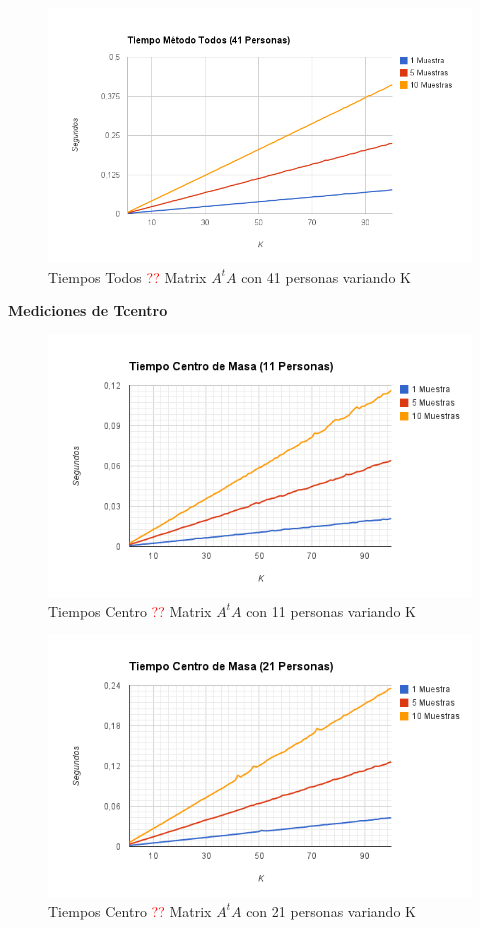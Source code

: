 \begin{figure}[H]
\includegraphics[width=1\textwidth]{img/image6.png}
     \caption{Tiempos Todos \textcolor{red}{??} Matrix $A^tA$ con 41 personas variando K}
     \label{fig:figura1}
\end{figure}


\textbf{Mediciones de Tcentro }

\begin{figure}[H]
\includegraphics[width=1\textwidth]{img/image7.png}
     \caption{Tiempos Centro \textcolor{red}{??} Matrix $A^tA$ con 11 personas variando K}
     \label{fig:figura1}
\end{figure}

\begin{figure}[H]
\includegraphics[width=1\textwidth]{img/image8.png}
     \caption{Tiempos Centro \textcolor{red}{??} Matrix $A^tA$ con 21 personas variando K}
     \label{fig:figura1}
\end{figure}

